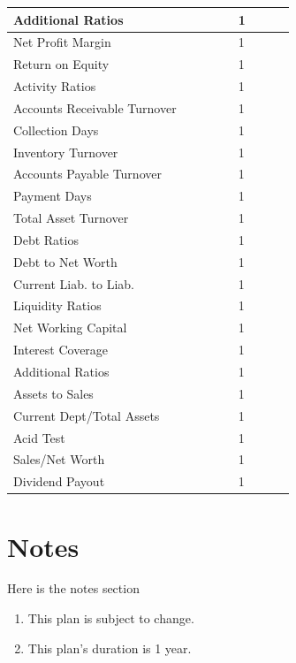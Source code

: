 \documentclass[11pt,titlepage]{article}
\begin{document}
\begin{landscape}
\begin{scriptsize}
\begin{tabular}{ | l | l | l | l | l | l | l | l | l |}
  Additional Ratios & & & & & 1\\\hline
  Net Profit Margin & & & & & 1\\\hline
  Return on Equity & & & & & 1\\\hline
  Activity Ratios & & & & & 1\\\hline
  Accounts Receivable Turnover & & & & & 1\\\hline
  Collection Days & & & & & 1\\\hline
  Inventory Turnover & & & & & 1\\\hline
  Accounts Payable Turnover & & & & & 1\\\hline
  Payment Days & & & & & 1\\\hline
  Total Asset Turnover & & & & & 1\\\hline
  Debt Ratios & & & & & 1\\\hline
  Debt to Net Worth & & & & & 1\\\hline
  Current Liab. to Liab. & & & & & 1\\\hline
  Liquidity Ratios & & & & & 1\\\hline
  Net Working Capital & & & & & 1\\\hline
  Interest Coverage & & & & & 1\\\hline
  Additional Ratios & & & & & 1\\\hline
  Assets to Sales & & & & & 1\\\hline
  Current Dept/Total Assets & & & & & 1\\\hline
  Acid Test & & & & & 1\\\hline
  Sales/Net Worth & & & & & 1\\\hline
  Dividend Payout & & & & & 1\\\hline
\end{tabular}
\end{scriptsize}
\end{landscape}

\pagebreak

\section{Notes}
Here is the notes section
\begin{enumerate}
\item This plan is subject to change.
\item This plan's duration is 1 year.
\end{enumerate}
\end{document}
